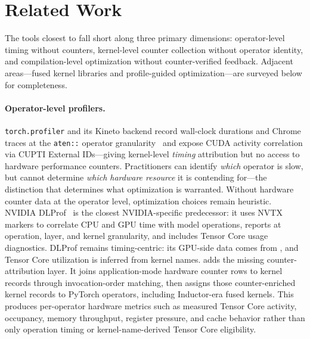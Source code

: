 \section{Related Work}
\label{sec:related}

The tools closest to \sys fall short along three primary dimensions: operator-level timing
without counters, kernel-level counter collection without operator identity, and
compilation-level optimization without counter-verified feedback. Adjacent areas---fused kernel
libraries and profile-guided optimization---are surveyed below for completeness.

\paragraph{Operator-level profilers.}
\texttt{torch.profiler} and its Kineto backend \cite{kineto2021} record wall-clock durations and
Chrome traces at the \texttt{aten::} operator granularity~\cite{pytorch2019} and expose CUDA activity correlation
via CUPTI External IDs---giving kernel-level \emph{timing} attribution but no access to hardware
performance counters. Practitioners can identify \emph{which} operator is slow, but cannot
determine \emph{which hardware resource} it is contending for---the distinction that determines
what optimization is warranted. Without hardware
counter data at the operator level, optimization choices remain heuristic.
NVIDIA DLProf~\cite{dlprof} is the closest NVIDIA-specific predecessor: it uses NVTX markers
to correlate CPU and GPU time with model operations, reports at operation, layer, and kernel
granularity, and includes Tensor Core usage diagnostics. DLProf remains timing-centric:
its GPU-side data comes from \nsys, and Tensor Core utilization is inferred from kernel names.
\sys adds the missing counter-attribution layer. It joins application-mode \ncu hardware
counter rows to \nsys kernel records through invocation-order matching, then assigns those
counter-enriched kernel records to PyTorch operators, including Inductor-era fused kernels.
This produces per-operator hardware metrics such as measured Tensor Core activity,
occupancy, memory throughput, register pressure, and cache behavior rather than only
operation timing or kernel-name-derived Tensor Core eligibility.

